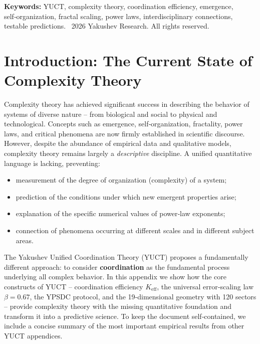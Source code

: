 \documentclass[11pt]{article}
\theoremstyle{remark}
\newcommand{\Keff}{K_{\mathrm{eff}}}
\begin{document}
\begin{titlepage}
\begin{abstract}
		\end{abstract}
		\vspace{0.5cm}
		\noindent
		{\small\textbf{Keywords:}} YUCT, complexity theory, coordination efficiency, emergence, self‑organization, fractal scaling, power laws, interdisciplinary connections, testable predictions.
		\vspace{0.2cm}
		\noindent
		\textcopyright\ 2026 Yakushev Research. All rights reserved.
	\end{titlepage}
	
	\tableofcontents
	\newpage
	
	\section{Introduction: The Current State of Complexity Theory}
	\label{sec:intro}
	
	Complexity theory has achieved significant success in describing the behavior of systems of diverse nature – from biological and social to physical and technological. Concepts such as emergence, self‑organization, fractality, power laws, and critical phenomena are now firmly established in scientific discourse. However, despite the abundance of empirical data and qualitative models, complexity theory remains largely a \emph{descriptive} discipline. A unified quantitative language is lacking, preventing:
	\begin{itemize}
		\item measurement of the degree of organization (complexity) of a system;
		\item prediction of the conditions under which new emergent properties arise;
		\item explanation of the specific numerical values of power‑law exponents;
		\item connection of phenomena occurring at different scales and in different subject areas.
	\end{itemize}
	
	The Yakushev Unified Coordination Theory (YUCT) proposes a fundamentally different approach: to consider \textbf{coordination} as the fundamental process underlying all complex behavior. In this appendix we show how the core constructs of YUCT – coordination efficiency \(\Keff\), the universal error‑scaling law \(\beta = 0.67\), the YPSDC protocol, and the 19‑dimensional geometry with 120 sectors – provide complexity theory with the missing quantitative foundation and transform it into a predictive science. To keep the document self‑contained, we include a concise summary of the most important empirical results from other YUCT appendices.
	
\end{document}
